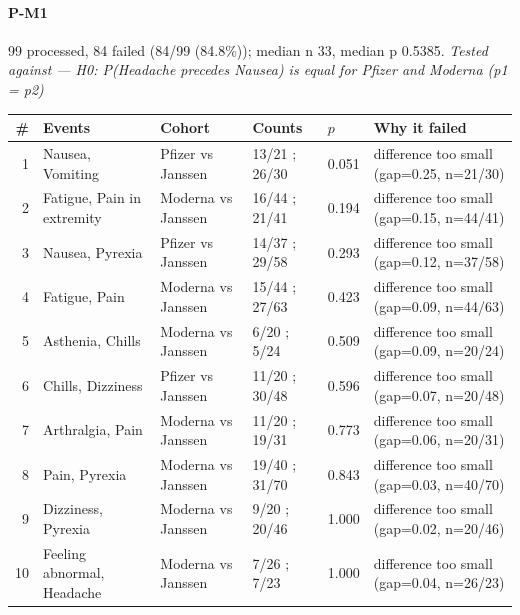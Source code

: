 \documentclass[11pt]{article}
\begin{document}
\paragraph{P-M1} 99 processed, 84 failed (84/99 (84.8\%)); median n 33, median p 0.5385. \emph{Tested against --- H0: P(Headache precedes Nausea) is equal for Pfizer and Moderna (p1 = p2)} \\
\begin{longtable}{@{}r p{3.9cm} p{2.5cm} l l p{4.4cm}@{}}
\toprule
\# & Events & Cohort & Counts & $p$ & Why it failed \\
\midrule \endhead
1 & Nausea, Vomiting & Pfizer vs Janssen & 13/21 ; 26/30 & 0.051 & difference too small (gap=0.25, n=21/30) \\
2 & Fatigue, Pain in extremity & Moderna vs Janssen & 16/44 ; 21/41 & 0.194 & difference too small (gap=0.15, n=44/41) \\
3 & Nausea, Pyrexia & Pfizer vs Janssen & 14/37 ; 29/58 & 0.293 & difference too small (gap=0.12, n=37/58) \\
4 & Fatigue, Pain & Moderna vs Janssen & 15/44 ; 27/63 & 0.423 & difference too small (gap=0.09, n=44/63) \\
5 & Asthenia, Chills & Moderna vs Janssen & 6/20 ; 5/24 & 0.509 & difference too small (gap=0.09, n=20/24) \\
6 & Chills, Dizziness & Pfizer vs Janssen & 11/20 ; 30/48 & 0.596 & difference too small (gap=0.07, n=20/48) \\
7 & Arthralgia, Pain & Moderna vs Janssen & 11/20 ; 19/31 & 0.773 & difference too small (gap=0.06, n=20/31) \\
8 & Pain, Pyrexia & Moderna vs Janssen & 19/40 ; 31/70 & 0.843 & difference too small (gap=0.03, n=40/70) \\
9 & Dizziness, Pyrexia & Moderna vs Janssen & 9/20 ; 20/46 & 1.000 & difference too small (gap=0.02, n=20/46) \\
10 & Feeling abnormal, Headache & Moderna vs Janssen & 7/26 ; 7/23 & 1.000 & difference too small (gap=0.04, n=26/23) \\
\bottomrule
\end{longtable}
\end{document}
